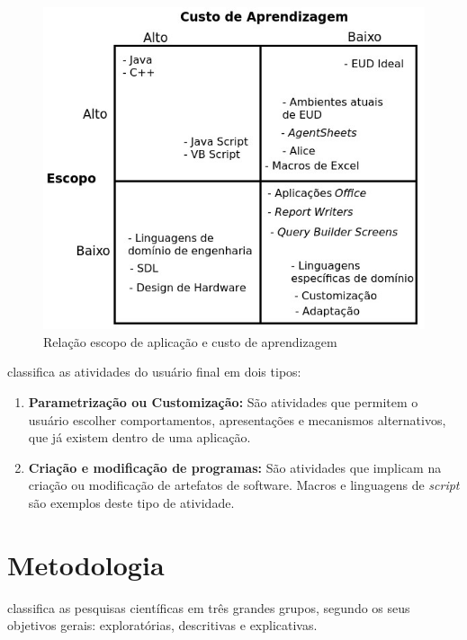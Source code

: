 \begin{figure}[h]
	\centering
	\label{fig01}
		\includegraphics[keepaspectratio=true]{figuras/trade_off_eud_editado}
	\caption{Relação escopo de aplicação e custo de aprendizagem}
\end{figure}
\pagebreak

 classifica as atividades do usuário final em dois tipos:

\begin{enumerate}
\item \textbf{Parametrização ou Customização:} São atividades que permitem o usuário escolher comportamentos, apresentações e mecanismos  alternativos, que já existem dentro de uma aplicação.

\item \textbf{Criação e modificação de programas:} São atividades que implicam na criação ou modificação de artefatos de software. Macros e linguagens de \textit{script} são exemplos deste tipo de atividade.
\end{enumerate}

 
\chapter[Metodologia]{Metodologia}

 classifica as pesquisas científicas em três grandes grupos, segundo os seus objetivos gerais: exploratórias, descritivas e explicativas.


